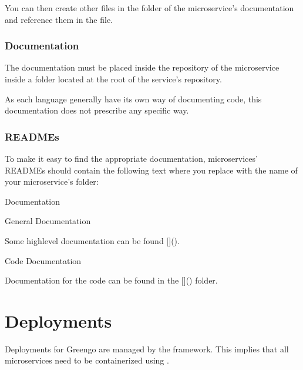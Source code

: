 \documentclass[letterpaper,10pt,english]{sphinxmanual}
\begin{document}
You can then create other files in the folder of the microservice’s documentation and reference them in the  file.


\subsection{ Documentation}
\label{\detokenize{building_a_microservice:code-documentation}}
The  documentation must be placed inside the repository of the microservice inside a  folder located at the root of the service’s repository.

As each language generally have its own way of documenting code, this documentation does not prescribe any specific way.


\subsection{READMEs}
\label{\detokenize{building_a_microservice:readmes}}
To make it easy to find the appropriate documentation, microservices’ READMEs should contain the following text where you replace  with the name of your microservice’s folder:

\begin{sphinxVerbatim}[commandchars=\\\{\}]
 Documentation

 General Documentation

Some high\PYGZhy{}level documentation can be found []().

 Code Documentation

Documentation for the code can be found in the []() folder.
\end{sphinxVerbatim}


\chapter{Deployments}
\label{\detokenize{deployments:deployments}}\label{\detokenize{deployments::doc}}
Deployments for Greengo are managed by the  framework.
This implies that all microservices need to be containerized using .
\end{document}
